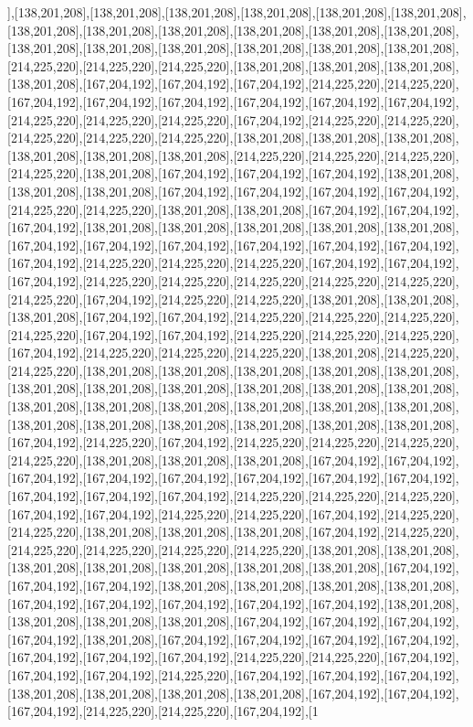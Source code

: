 ],[138,201,208],[138,201,208],[138,201,208],[138,201,208],[138,201,208],[138,201,208],[138,201,208],[138,201,208],[138,201,208],[138,201,208],[138,201,208],[138,201,208],[138,201,208],[138,201,208],[138,201,208],[138,201,208],[138,201,208],[138,201,208],[214,225,220],[214,225,220],[214,225,220],[138,201,208],[138,201,208],[138,201,208],[138,201,208],[167,204,192],[167,204,192],[167,204,192],[214,225,220],[214,225,220],[167,204,192],[167,204,192],[167,204,192],[167,204,192],[167,204,192],[167,204,192],[214,225,220],[214,225,220],[214,225,220],[167,204,192],[214,225,220],[214,225,220],[214,225,220],[214,225,220],[214,225,220],[138,201,208],[138,201,208],[138,201,208],[138,201,208],[138,201,208],[138,201,208],[214,225,220],[214,225,220],[214,225,220],[214,225,220],[138,201,208],[167,204,192],[167,204,192],[167,204,192],[138,201,208],[138,201,208],[138,201,208],[167,204,192],[167,204,192],[167,204,192],[167,204,192],[214,225,220],[214,225,220],[138,201,208],[138,201,208],[167,204,192],[167,204,192],[167,204,192],[138,201,208],[138,201,208],[138,201,208],[138,201,208],[138,201,208],[167,204,192],[167,204,192],[167,204,192],[167,204,192],[167,204,192],[167,204,192],[167,204,192],[214,225,220],[214,225,220],[214,225,220],[167,204,192],[167,204,192],[167,204,192],[214,225,220],[214,225,220],[214,225,220],[214,225,220],[214,225,220],[214,225,220],[167,204,192],[214,225,220],[214,225,220],[138,201,208],[138,201,208],[138,201,208],[167,204,192],[167,204,192],[214,225,220],[214,225,220],[214,225,220],[214,225,220],[167,204,192],[167,204,192],[214,225,220],[214,225,220],[214,225,220],[167,204,192],[214,225,220],[214,225,220],[214,225,220],[138,201,208],[214,225,220],[214,225,220],[138,201,208],[138,201,208],[138,201,208],[138,201,208],[138,201,208],[138,201,208],[138,201,208],[138,201,208],[138,201,208],[138,201,208],[138,201,208],[138,201,208],[138,201,208],[138,201,208],[138,201,208],[138,201,208],[138,201,208],[138,201,208],[138,201,208],[138,201,208],[138,201,208],[138,201,208],[138,201,208],[167,204,192],[214,225,220],[167,204,192],[214,225,220],[214,225,220],[214,225,220],[214,225,220],[138,201,208],[138,201,208],[138,201,208],[167,204,192],[167,204,192],[167,204,192],[167,204,192],[167,204,192],[167,204,192],[167,204,192],[167,204,192],[167,204,192],[167,204,192],[167,204,192],[214,225,220],[214,225,220],[214,225,220],[167,204,192],[167,204,192],[214,225,220],[214,225,220],[167,204,192],[214,225,220],[214,225,220],[138,201,208],[138,201,208],[138,201,208],[167,204,192],[214,225,220],[214,225,220],[214,225,220],[214,225,220],[214,225,220],[138,201,208],[138,201,208],[138,201,208],[138,201,208],[138,201,208],[138,201,208],[138,201,208],[167,204,192],[167,204,192],[167,204,192],[138,201,208],[138,201,208],[138,201,208],[138,201,208],[167,204,192],[167,204,192],[167,204,192],[167,204,192],[167,204,192],[138,201,208],[138,201,208],[138,201,208],[138,201,208],[167,204,192],[167,204,192],[167,204,192],[167,204,192],[138,201,208],[167,204,192],[167,204,192],[167,204,192],[167,204,192],[167,204,192],[167,204,192],[167,204,192],[214,225,220],[214,225,220],[167,204,192],[167,204,192],[167,204,192],[214,225,220],[167,204,192],[167,204,192],[167,204,192],[138,201,208],[138,201,208],[138,201,208],[138,201,208],[167,204,192],[167,204,192],[167,204,192],[214,225,220],[214,225,220],[167,204,192],[1